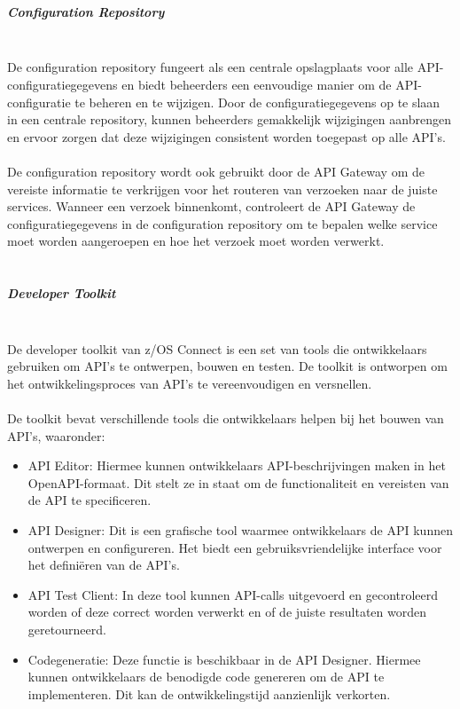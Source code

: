 \\ \\
\subparagraph{Configuration Repository} \mbox{} \\
De configuration repository fungeert als een centrale opslagplaats voor alle API-configuratiegegevens en biedt beheerders een eenvoudige manier om de API-configuratie te beheren en te wijzigen. Door de configuratiegegevens op te slaan in een centrale repository, kunnen beheerders gemakkelijk wijzigingen aanbrengen en ervoor zorgen dat deze wijzigingen consistent worden toegepast op alle API's. \autocite{IBM2023a}
\\ \\
De configuration repository wordt ook gebruikt door de API Gateway om de vereiste informatie te verkrijgen voor het routeren van verzoeken naar de juiste services. Wanneer een verzoek binnenkomt, controleert de API Gateway de configuratiegegevens in de configuration repository om te bepalen welke service moet worden aangeroepen en hoe het verzoek moet worden verwerkt. \autocite{IBM2023a}
\\ \\
\subparagraph{Developer Toolkit} \mbox{} \\
De developer toolkit van z/OS Connect is een set van tools die ontwikkelaars gebruiken om API's te ontwerpen, bouwen en testen. De toolkit is ontworpen om het ontwikkelingsproces van API's te vereenvoudigen en versnellen. \autocite{IBM2023b}
\\ \\
De toolkit bevat verschillende tools die ontwikkelaars helpen bij het bouwen van API's, waaronder:
\begin{itemize}
    \item API Editor: Hiermee kunnen ontwikkelaars API-beschrijvingen maken in het OpenAPI-formaat. Dit stelt ze in staat om de functionaliteit en vereisten van de API te specificeren.
    \item API Designer: Dit is een grafische tool waarmee ontwikkelaars de API kunnen ontwerpen en configureren. Het biedt een gebruiksvriendelijke interface voor het definiëren van de API's.
    \item API Test Client: In deze tool kunnen API-calls uitgevoerd en gecontroleerd worden of deze correct worden verwerkt en of de juiste resultaten worden geretourneerd.
    \item Codegeneratie: Deze functie is beschikbaar in de API Designer. Hiermee kunnen ontwikkelaars de benodigde code genereren om de API te implementeren. Dit kan de ontwikkelingstijd aanzienlijk verkorten.
\end{itemize} \autocite{IBM2023b}
\\ \\
